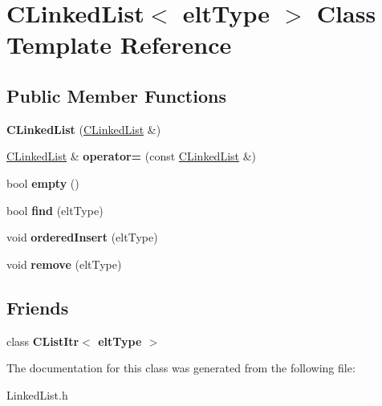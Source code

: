 \hypertarget{classCLinkedList}{\section{C\-Linked\-List$<$ elt\-Type $>$ Class Template Reference}
\label{classCLinkedList}
}
\subsection*{Public Member Functions}
\begin{DoxyCompactItemize}
\item 
\hypertarget{classCLinkedList_aa9d627407d1582b4527d0d70086da869}{{\bfseries C\-Linked\-List} (\hyperlink{classCLinkedList}{C\-Linked\-List} \&)}\label{classCLinkedList_aa9d627407d1582b4527d0d70086da869}

\item 
\hypertarget{classCLinkedList_a5cdb18b23bb633c8a153f0c9cddec32c}{\hyperlink{classCLinkedList}{C\-Linked\-List} \& {\bfseries operator=} (const \hyperlink{classCLinkedList}{C\-Linked\-List} \&)}\label{classCLinkedList_a5cdb18b23bb633c8a153f0c9cddec32c}

\item 
\hypertarget{classCLinkedList_a125bed89da1a699270a84a0e67e00c89}{bool {\bfseries empty} ()}\label{classCLinkedList_a125bed89da1a699270a84a0e67e00c89}

\item 
\hypertarget{classCLinkedList_a88f7681ddf8077fbb2c3aa98e421da09}{bool {\bfseries find} (elt\-Type)}\label{classCLinkedList_a88f7681ddf8077fbb2c3aa98e421da09}

\item 
\hypertarget{classCLinkedList_acff65e25c37b32f27b2f5503c18fb257}{void {\bfseries ordered\-Insert} (elt\-Type)}\label{classCLinkedList_acff65e25c37b32f27b2f5503c18fb257}

\item 
\hypertarget{classCLinkedList_a350c6d42e73a61d235ffe4f841bc4a0b}{void {\bfseries remove} (elt\-Type)}\label{classCLinkedList_a350c6d42e73a61d235ffe4f841bc4a0b}

\end{DoxyCompactItemize}
\subsection*{Friends}
\begin{DoxyCompactItemize}
\item 
\hypertarget{classCLinkedList_ac76a869ca4ec3b044e17f832fd9e1de1}{class {\bfseries C\-List\-Itr$<$ elt\-Type $>$}}\label{classCLinkedList_ac76a869ca4ec3b044e17f832fd9e1de1}

\end{DoxyCompactItemize}


The documentation for this class was generated from the following file\-:\begin{DoxyCompactItemize}
\item 
Linked\-List.\-h\end{DoxyCompactItemize}
